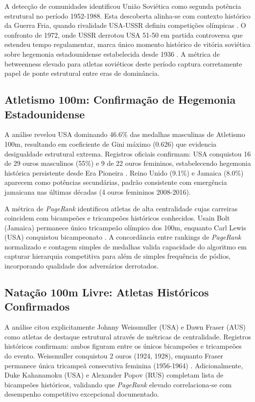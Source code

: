 A detecção de comunidades identificou União Soviética como segunda potência estrutural no período 1952-1988. Esta descoberta alinha-se com contexto histórico da Guerra Fria, quando rivalidade USA-USSR definiu competições olímpicas \cite{AlphaHistoryColdWar2024}. O confronto de 1972, onde USSR derrotou USA 51-50 em partida controversa que estendeu tempo regulamentar, marca único momento histórico de vitória soviética sobre hegemonia estadounidense estabelecida desde 1936 \cite{NBCBasketballHistory2024}. A métrica de betweenness elevado para atletas soviéticos deste período captura corretamente papel de ponte estrutural entre eras de dominância.

\subsection{Atletismo 100m: Confirmação de Hegemonia Estadounidense}

A análise revelou USA dominando 46.6\% das medalhas masculinas de Atletismo 100m, resultando em coeficiente de Gini máximo (0.626) que evidencia desigualdade estrutural extrema. Registros oficiais confirmam: USA conquistou 16 de 29 ouros masculinos (55\%) e 9 de 22 ouros femininos, estabelecendo hegemonia histórica persistente desde Era Pioneira \cite{Olympics100mWinners2024}. Reino Unido (9.1\%) e Jamaica (8.0\%) aparecem como potências secundárias, padrão consistente com emergência jamaicana nas últimas décadas (4 ouros femininos 2008-2016).

A métrica de \textit{PageRank} identificou atletas de alta centralidade cujas carreiras coincidem com bicampeões e tricampeões históricos conhecidos. Usain Bolt (Jamaica) permanece único tricampeão olímpico dos 100m, enquanto Carl Lewis (USA) conquistou bicampeonato \cite{Olympics100mWinners2024}. A concordância entre rankings de \textit{PageRank} normalizado e contagem simples de medalhas valida capacidade do algoritmo em capturar hierarquia competitiva para além de simples frequência de pódios, incorporando qualidade dos adversários derrotados.

\subsection{Natação 100m Livre: Atletas Históricos Confirmados}

A análise citou explicitamente Johnny Weissmuller (USA) e Dawn Fraser (AUS) como atletas de destaque estrutural através de métricas de centralidade. Registros históricos confirmam: ambos figuram entre os únicos bicampeões e tricampeões do evento. Weissmuller conquistou 2 ouros (1924, 1928), enquanto Fraser permanece única tricampeã consecutiva feminina (1956-1964) \cite{TopEndSwimming100m2024}. Adicionalmente, Duke Kahanamoku (USA) e Alexander Popov (RUS) completam lista de bicampeões históricos, validando que \textit{PageRank} elevado correlaciona-se com desempenho competitivo excepcional documentado.

